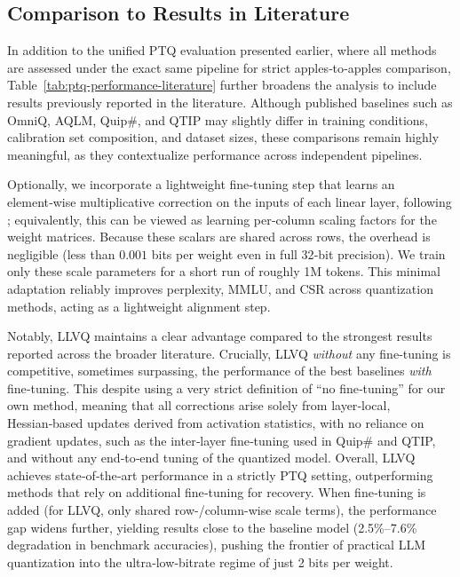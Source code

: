 \documentclass{article}
\theoremstyle{plain}
\theoremstyle{definition}
\theoremstyle{remark}
\begin{document}
\subsection{Comparison to Results in Literature}

In addition to the unified PTQ evaluation presented earlier, where all methods are assessed under the exact same pipeline for strict apples‑to‑apples comparison, Table~\ref{tab:ptq-performance-literature} further broadens the analysis to include results previously reported in the literature. Although published baselines such as OmniQ, AQLM, Quip\#, and QTIP may slightly differ in training conditions, calibration set composition, and dataset sizes, these comparisons remain highly meaningful, as they contextualize performance across independent pipelines.

Optionally, we incorporate a lightweight fine‑tuning step that learns an element‑wise multiplicative correction on the inputs of each linear layer, following \citep{tseng2024quip}; equivalently, this can be viewed as learning per‑column scaling factors for the weight matrices. Because these scalars are shared across rows, the overhead is negligible (less than $0.001$ bits per weight even in full 32‑bit precision). We train only these scale parameters for a short run of roughly 1M tokens. This minimal adaptation reliably improves perplexity, MMLU, and CSR across quantization methods, acting as a lightweight alignment step. 

Notably, LLVQ maintains a clear advantage compared to the strongest results reported across the broader literature. Crucially, LLVQ \textit{without} any fine‑tuning is competitive, sometimes surpassing, the performance of the best baselines \textit{with} fine‑tuning. This despite using a very strict definition of “no fine‑tuning” for our own method, meaning that all corrections arise solely from layer‑local, Hessian‑based updates derived from activation statistics, with no reliance on gradient updates, such as the inter‑layer fine‑tuning used in Quip\# and QTIP, and without any end‑to‑end tuning of the quantized model. Overall, LLVQ achieves state‑of‑the‑art performance in a strictly PTQ setting, outperforming methods that rely on additional fine‑tuning for recovery. When fine‑tuning is added (for LLVQ, only shared row-/column-wise scale terms), the performance gap widens further, yielding results close to the baseline model (2.5\%–7.6\% degradation in benchmark accuracies), pushing the frontier of practical LLM quantization into the ultra‑low‑bitrate regime of just 2 bits per weight.
\end{document}
